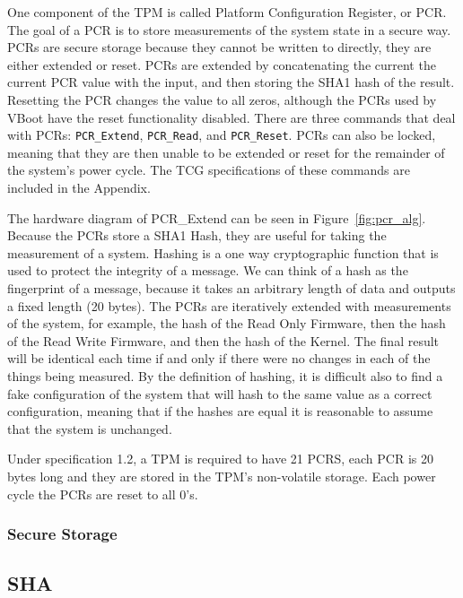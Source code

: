 \documentclass[../report.tex]{subfiles}
\def\code#1{\texttt{#1}}
\begin{document}
One component of the TPM is called Platform Configuration Register, or PCR.
The goal of a PCR is to store measurements of the system state in a secure way. 
PCRs are secure storage because they cannot be written to directly, they are either extended or reset. 
PCRs are extended by concatenating the current the current PCR value with the input, and then storing the SHA1 hash of the result. 
Resetting the PCR changes the value to all zeros, although the PCRs used by VBoot have the reset functionality disabled.
There are three commands that deal with PCRs: \code{PCR\_Extend},
\code{PCR\_Read}, and \code{PCR\_Reset}.
PCRs can also be locked, meaning that they are then unable to be extended or reset for the remainder of the system's power cycle.
The TCG specifications of these commands are included in the Appendix.


The hardware diagram of PCR\_Extend can be seen in Figure~\ref{fig:pcr_alg}.
Because the PCRs store a SHA1 Hash, they are useful for taking the measurement of a system.  
Hashing is a one way cryptographic function that is used to protect the integrity of a message.
We can think of a hash as the fingerprint of a message, because it takes an arbitrary length of data and outputs a fixed length (20 bytes).
The PCRs are iteratively extended with measurements of the system, for example, the hash of the Read Only Firmware, then the hash of the Read Write Firmware, and then the hash of the Kernel.
The final result will be identical each time if and only if there were no changes in each of the things being measured.
By the definition of hashing, it is difficult also to find a fake configuration of the system that will hash to the same value as a correct configuration, meaning that if the hashes are equal it is reasonable to assume that the system is unchanged. 

Under specification 1.2, a TPM is required to have 21 PCRS, each PCR is 20 bytes
long and they are stored in the TPM's non-volatile storage.
Each power cycle the PCRs are reset to all 0's.

\subsubsection{Secure Storage}


\subsection{SHA}
\end{document}
